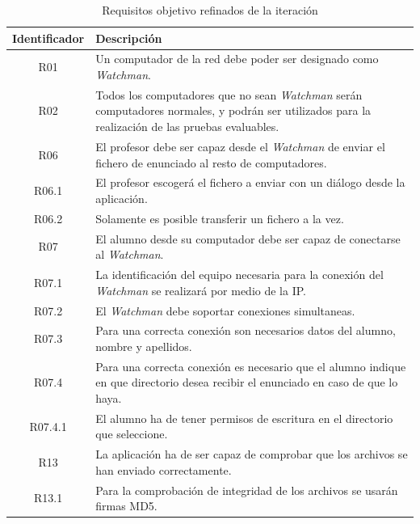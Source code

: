 \begin{table}
    \begin{tabular}{|c|p{10cm}|}
        \hline
        \textbf{Identificador} & \textbf{Descripción}
        \\ \hline

        R01 & Un computador de la red debe poder ser designado como \emph{Watchman}.
        \\ \hline

        R02 & Todos los computadores que no sean \emph{Watchman} serán computadores
        normales, y podrán ser utilizados para la realización de las pruebas evaluables.
        \\ \hline

        R06 & El profesor debe ser capaz desde el \emph{Watchman} de enviar el fichero de enunciado al resto de computadores.
        \\ \hline

        R06.1 & El profesor escogerá el fichero a enviar con un diálogo desde la aplicación.
        \\ \hline

        R06.2 & Solamente es posible transferir un fichero a la vez.
        \\ \hline

        R07 & El alumno desde su computador debe ser capaz de conectarse al \emph{Watchman}.
        \\ \hline

        R07.1 & La identificación del equipo necesaria para la conexión del \emph{Watchman} se realizará por medio de la IP.
        \\ \hline

        R07.2 & El \emph{Watchman} debe soportar conexiones simultaneas.
        \\ \hline

        R07.3 & Para una correcta conexión son necesarios datos del alumno, nombre y apellidos.
        \\ \hline

        R07.4 & Para una correcta conexión es necesario que el alumno indique en que directorio desea recibir el enunciado en caso de que lo haya.
        \\ \hline

        R07.4.1 & El alumno ha de tener permisos de escritura en el directorio que seleccione.
        \\ \hline

        R13 & La aplicación ha de ser capaz de comprobar que los archivos se han enviado correctamente.
        \\ \hline

        R13.1 & Para la comprobación de integridad de los archivos se usarán firmas MD5.
        \\ \hline

    \end{tabular}
    \caption{Requisitos objetivo refinados de la iteración}
    \label{tabla:iteracion1:requisitosObjetivoRefinados}
\end{table}


